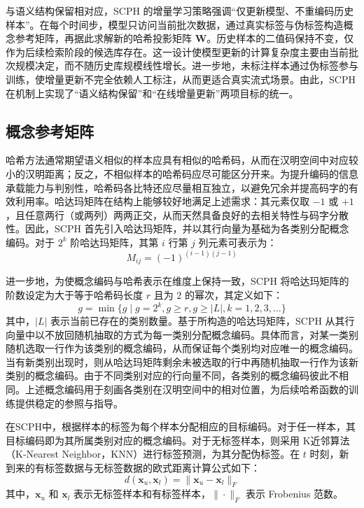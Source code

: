 与语义结构保留相对应，SCPH 的增量学习策略强调“仅更新模型、不重编码历史样本”。在每个时间步，模型只访问当前批次数据，通过真实标签与伪标签构造概念参考矩阵，再据此求解新的哈希投影矩阵 $\mathbf{W}$。历史样本的二值码保持不变，仅作为后续检索阶段的候选库存在。这一设计使模型更新的计算复杂度主要由当前批次规模决定，而不随历史库规模线性增长。进一步地，未标注样本通过伪标签参与训练，使增量更新不完全依赖人工标注，从而更适合真实流式场景。由此，SCPH 在机制上实现了“语义结构保留”和“在线增量更新”两项目标的统一。

\subsection{概念参考矩阵}

哈希方法通常期望语义相似的样本应具有相似的哈希码，从而在汉明空间中对应较小的汉明距离；反之，不相似样本的哈希码应尽可能区分开来。为提升编码的信息承载能力与判别性，哈希码各比特还应尽量相互独立，以避免冗余并提高码字的有效利用率。哈达玛矩阵在结构上能够较好地满足上述需求：其元素仅取 $-1$ 或 $+1$，且任意两行（或两列）两两正交，从而天然具备良好的去相关特性与码字分散性。因此，SCPH 首先引入哈达玛矩阵，并以其行向量为基础为各类别分配概念编码。对于 $2^k$ 阶哈达玛矩阵，其第 $i$ 行第 $j$ 列元素可表示为：
\begin{equation}
  M_{ij} = (-1)^{(i-1)(j-1)}
\end{equation}

进一步地，为使概念编码与哈希表示在维度上保持一致，SCPH 将哈达玛矩阵的阶数设定为大于等于哈希码长度 $r$ 且为 $2$ 的幂次，其定义如下：
\begin{equation}
  g = \min \{g \mid g=2^k, g \ge r, g \ge |L|, k=1,2,3,\dots \}
\end{equation}
其中，$|L|$ 表示当前已存在的类别数量。基于所构造的哈达玛矩阵，SCPH 从其行向量中以不放回随机抽取的方式为每一类别分配概念编码。具体而言，对某一类别随机选取一行作为该类别的概念编码，从而保证每个类别均对应唯一的概念编码。当有新类别出现时，则从哈达玛矩阵剩余未被选取的行中再随机抽取一行作为该新类别的概念编码。由于不同类别对应的行向量不同，各类别的概念编码彼此不相同。上述概念编码用于刻画各类别在汉明空间中的相对位置，为后续哈希函数的训练提供稳定的参照与指导。

在SCPH中，根据样本的标签为每个样本分配相应的目标编码。对于任一样本，其目标编码即为其所属类别对应的概念编码。对于无标签样本，则采用 K近邻算法（K-Nearest Neighbor，KNN）进行标签预测，为其分配伪标签。在 $t$ 时刻，新到来的有标签数据与无标签数据的欧式距离计算公式如下：
\begin{equation}
  d(\mathbf{x}_u, \mathbf{x}_l) = \|\mathbf{x}_u - \mathbf{x}_l\|_F
\label{eq:scph-distance}
\end{equation}
其中，$\mathbf{x}_u$ 和 $\mathbf{x}_l$ 表示无标签样本和有标签样本，$\|\cdot\|_F$ 表示 Frobenius 范数。

